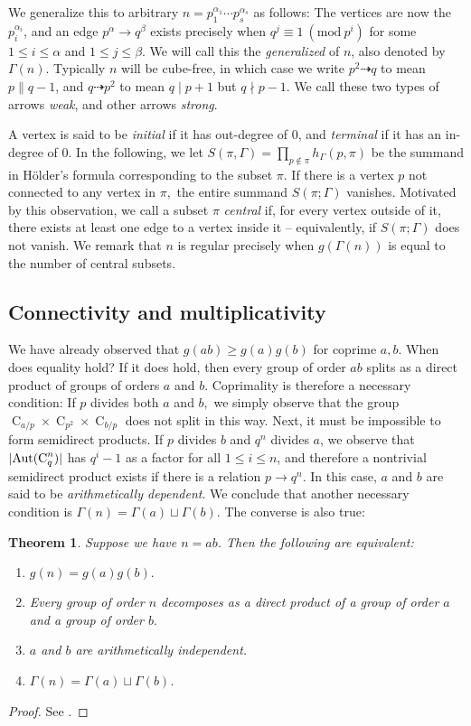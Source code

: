 \documentclass[a4paper, 12pt]{article}
\DeclarePairedDelimiter\abs{\lvert}{\rvert}
\newcommand{\ufdsh}{p_1^{\alpha_1} \cdots p_s^{\alpha_s}}
\newcommand{\aut}[1]{\operatorname{Aut}(#1)}
\newcommand{\cyc}[1]{\operatorname{C}_{#1}}
\newcommand{\Mod}[1]{\ (\mathrm{mod} \ #1)}
\theoremstyle{plain}
\newtheorem{thm}{Theorem}[section]
\theoremstyle{definition}
\begin{document}
We generalize this to arbitrary $n = \ufdsh$ as follows: The vertices are now the $p_i^{\alpha_i}$, and an edge $p^\alpha \rightarrow q^\beta$ exists precisely when $q^j \equiv 1 \Mod{p^i}$ for some $1 \le i \le \alpha$ and $1 \le j \le \beta$. We will call this the \emph{generalized \hg} of $n$, also denoted by $\Gamma(n)$. Typically $n$ will be cube-free, in which case we write $p^2 \dashrightarrow q$ to mean $p \parallel q - 1$, and $q \dashrightarrow p^2$ to mean $q \mid p + 1$ but $q \nmid p - 1$. We call these two types of arrows \emph{weak}, and other arrows \emph{strong}.

A vertex is said to be \emph{initial} if it has out-degree of $0$, and \emph{terminal} if it has an in-degree of $0$. In the following, we let $S(\pi, \Gamma) = \prod_{p \notin \pi}h_\Gamma(p, \pi)$ be the summand in Hölder's formula corresponding to the subset $\pi$. If there is a vertex $p$ not connected to any vertex in $\pi,$ the entire summand $S(\pi; \Gamma)$ vanishes. Motivated by this observation, we call a subset $\pi$ \emph{central} if, for every vertex outside of it, there exists at least one edge to a vertex inside it -- equivalently, if $S(\pi; \Gamma)$ does not vanish. We remark that $n$ is regular precisely when $g(\Gamma(n))$ is equal to the number of central subsets.

\subsection{Connectivity and multiplicativity}
We have already observed that $g(ab) \ge g(a)g(b)$ for coprime $a, b$. When does equality hold? If it does hold, then every group of order $ab$ splits as a direct product of groups of orders $a$ and $b.$ Coprimality is therefore a necessary condition: If $p$ divides both $a$ and $b,$ we simply observe that the group $\cyc{a/p} \times \cyc{p^2} \times \cyc{b/p}$ does not split in this way. Next, it must be impossible to form semidirect products. If $p$ divides $b$ and $q^n$ divides $a$, we observe that $\abs{\aut{\cyc{q}^n}}$ has $q^i - 1$ as a factor for all $1 \le i \le n$, and therefore a nontrivial semidirect product exists if there is a relation $p \rightarrow q^n.$ In this case, $a$ and $b$ are said to be \emph{arithmetically dependent}. We conclude that another necessary condition is $\Gamma(n) = \Gamma(a) \sqcup \Gamma(b)$.  The converse is also true:

\begin{thm}
	Suppose we have $n = ab$. Then the following are equivalent:
	\begin{enumerate}
		\item $g(n) = g(a)g(b).$
		\item Every group of order $n$ decomposes as a direct product of a group of order $a$ and a group of order $b.$
		\item $a$ and $b$ are arithmetically independent.
		\item $\Gamma(n) = \Gamma(a) \sqcup \Gamma(b)$.
	\end{enumerate}
\end{thm}
\begin{proof}
	See {\cite[Lem.~21.19]{monolith}}.
\end{proof}
\end{document}
